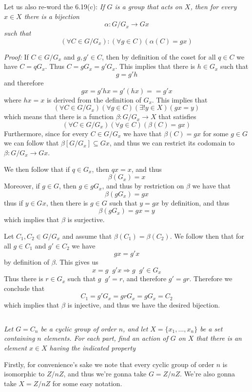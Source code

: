 \documentclass[11pt,oneside,titlepage]{book}
\DeclareMathOperator \inv {^{-1}}
\DeclareMathOperator \ra {\Rightarrow}
\newcommand{\set}[1]{\{ #1 \}}
\begin{document}
Let us also re-word the 6.19(c): \textit{If $G$ is a group that acts
on $X$, then for every $x \in X$ there is a bijection
$$\alpha: G/G_x \to Gx$$
such that
$$(\forall C \in G/G_x): (\forall g \in C)(\alpha(C) = gx)$$}

\textit{Proof: } If $C \in G/G_x$ and $g, g' \in C$, then by definition of
the coset for all $q \in C$ we have $C = qG_x$. Thus
$C = gG_x = g'G_x$. This implies that there is $h \in G_x$
such that
$$g = g' h$$
and therefore
$$gx = g' h x = g' (h x) =  = g'x$$
where $hx = x$ is derived from the definition of $G_x$.
This implies that
$$(\forall C \in G/G_x)(\forall g \in C)(\exists !  y \in X)(gx = y)$$
which means that there is a function $\beta: G/G_x \to X$ that satisfies
$$(\forall C \in G/G_x)( \forall g \in C)(\beta(C) = gx)$$
Furthermore, since for every $C \in G/G_x$ we have that $\beta(C) = gx$
for some $g \in G$ we can follow that $\beta[G/G_x] \subseteq Gx$,
and thus we can restrict its codomain to $\beta: G/G_x \to Gx$.

We then follow that if $q \in G_x$, then $qx = x$, and thus
$$\beta(G_x) = x$$
Moreover, if $g \in G$, then $g \in gG_x$, and thus by restriction on $\beta$
we have that
$$\beta(gG_x) = gx$$
thus if $y \in Gx$, then there is $g \in G$ such that $y = gx$ by definition,
and thus
$$\beta(gG_x) = gx = y$$
which implies that $\beta$ is surjective.

Let  $C_1, C_2 \in G/G_x$ and assume that $\beta(C_1) = \beta(C_2)$.
We follow then that for all $g \in C_1$ and $g' \in C_2$ we have
$$gx = g'x$$
by definition of $\beta$. This gives us
$$x = g\inv g'x \ra g\inv g' \in G_x$$
Thus there is $r \in G_x$ such that $g\inv g' = r$, and therefore
$g' = gr$. Therefore we conclude that
$$C_1 = g'G_x = gr G_x = g G_x = C_2$$
which implies that $\beta$ is injective, and thus we have the desired
bijection.

\subsection{}

\textit{Let $G = C_n$ be a cyclic group of order $n$, and let $X =
\set{x_1, ..., x_n}$ be a set containing $n$ elements. For each part,
find an action of $G$ on $X$ that there is an element $x \in X$ having
the indicated property}

Firstly, for convenience's sake we note that every cyclic group of
order $n$ is isomorphic to $Z/nZ$, and thus we're gonna take
$G = Z/nZ$. We're also gonna take $X = Z/nZ$ for some easy notation.
\end{document}
